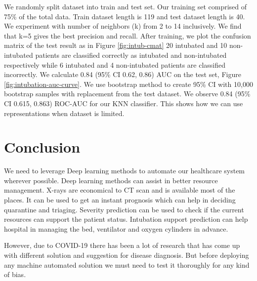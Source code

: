\documentclass[a4paper]{article}
\begin{document}
We randomly split dataset into train and test set. Our training set comprised of 75\% of the total data. Train dataset length is 119 and test dataset length is 40.
We experiment with number of neighbors (k) from 2 to 14 inclusively. We find that k=5 gives the best precision and recall.
After training, we plot the confusion matrix of the test result as in Figure \ref{fig:intub-cmat}
20 intubated and 10 non-intubated patients are classified correctly as intubated and non-intubated respectively while 6 intubated and 4 non-intubated patients are classified incorrectly.
We calculate 0.84 (95\% CI 0.62, 0.86) AUC on the test set, Figure \ref{fig:intubation-auc-curve}.
We use bootstrap method to create 95\% CI with 10,000 bootstrap samples with replacement from the test dataset. We observe 0.84 (95\% CI 0.615, 0.863) ROC-AUC for our KNN classifier.
This shows how we can use representations when dataset is limited.


\section{Conclusion}
We need to leverage Deep learning methods to automate our healthcare system wherever possible. Deep learning methods can assist in better resource management.
X-rays are economical to CT scan and is available most of the places. It can be used to get an instant prognosis which can help in deciding quarantine and triaging.
Severity prediction can be used to check if the current resources can support the patient status. Intubation support prediction can help hospital in managing the bed, ventilator and oxygen cylinders in advance.

However, due to COVID-19 there has been a lot of research that has come up with different solution and suggestion for disease diagnosis. But before deploying any machine automated solution we must need to test it thoroughly for any kind of bias.








\end{document}
